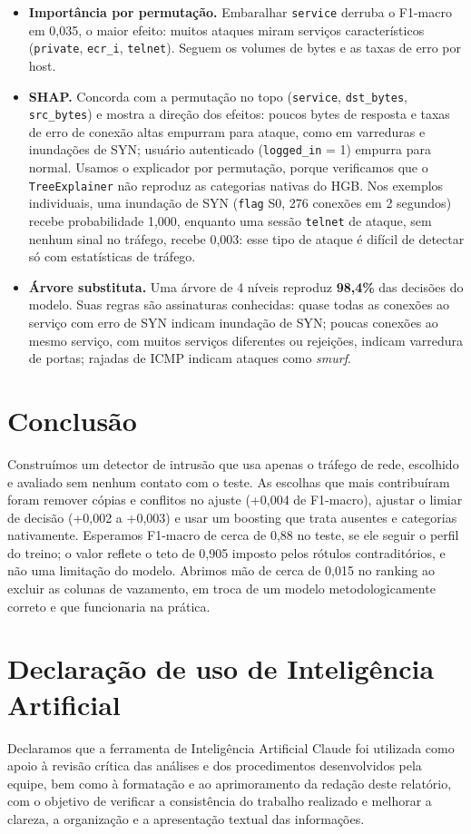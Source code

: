 \documentclass[11pt,a4paper]{article}
\begin{document}
\begin{itemize}
\item \textbf{Importância por permutação.} Embaralhar \texttt{service} derruba o F1-macro em 0,035, o maior efeito: muitos ataques miram serviços característicos (\texttt{private}, \texttt{ecr\_i}, \texttt{telnet}). Seguem os volumes de bytes e as taxas de erro por host.
\item \textbf{SHAP.} Concorda com a permutação no topo (\texttt{service}, \texttt{dst\_bytes}, \texttt{src\_bytes}) e mostra a direção dos efeitos: poucos bytes de resposta e taxas de erro de conexão altas empurram para ataque, como em varreduras e inundações de SYN; usuário autenticado (\texttt{logged\_in} = 1) empurra para normal. Usamos o explicador por permutação, porque verificamos que o \texttt{TreeExplainer} não reproduz as categorias nativas do HGB. Nos exemplos individuais, uma inundação de SYN (\texttt{flag} S0, 276 conexões em 2 segundos) recebe probabilidade 1,000, enquanto uma sessão \texttt{telnet} de ataque, sem nenhum sinal no tráfego, recebe 0,003: esse tipo de ataque é difícil de detectar só com estatísticas de tráfego.
\item \textbf{Árvore substituta.} Uma árvore de 4 níveis reproduz \textbf{98,4\%} das decisões do modelo. Suas regras são assinaturas conhecidas: quase todas as conexões ao serviço com erro de SYN indicam inundação de SYN; poucas conexões ao mesmo serviço, com muitos serviços diferentes ou rejeições, indicam varredura de portas; rajadas de ICMP indicam ataques como \emph{smurf}.
\end{itemize}

\section{Conclusão}

Construímos um detector de intrusão que usa apenas o tráfego de rede, escolhido e avaliado sem nenhum contato com o teste. As escolhas que mais contribuíram foram remover cópias e conflitos no ajuste (+0,004 de F1-macro), ajustar o limiar de decisão (+0,002 a +0,003) e usar um boosting que trata ausentes e categorias nativamente. Esperamos F1-macro de cerca de 0,88 no teste, se ele seguir o perfil do treino; o valor reflete o teto de 0,905 imposto pelos rótulos contraditórios, e não uma limitação do modelo. Abrimos mão de cerca de 0,015 no ranking ao excluir as colunas de vazamento, em troca de um modelo metodologicamente correto e que funcionaria na prática.

\section*{Declaração de uso de Inteligência Artificial}

Declaramos que a ferramenta de Inteligência Artificial Claude foi utilizada como apoio à revisão crítica das análises e dos procedimentos desenvolvidos pela equipe, bem como à formatação e ao aprimoramento da redação deste relatório, com o objetivo de verificar a consistência do trabalho realizado e melhorar a clareza, a organização e a apresentação textual das informações.
\end{document}
